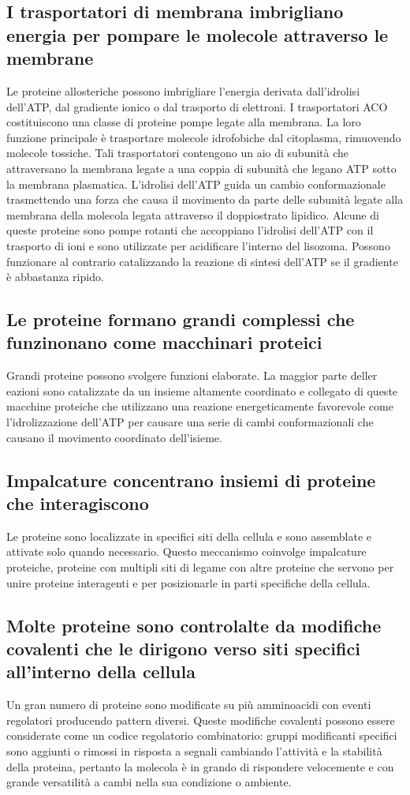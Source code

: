 \subsection{I trasportatori di membrana imbrigliano energia per pompare le molecole attraverso le membrane}
Le proteine allosteriche possono imbrigliare l'energia derivata dall'idrolisi dell'ATP, dal gradiente ionico o dal trasporto di elettroni. I trasportatori ACO costituiscono una classe
di proteine pompe legate alla membrana. La loro funzione principale \`e trasportare molecole idrofobiche dal citoplasma, rimuovendo molecole tossiche. Tali trasportatori contengono un
aio di subunit\`a che attraversano la membrana legate a una coppia di subunit\`a che legano ATP sotto la membrana plasmatica. L'idrolisi dell'ATP guida un cambio conformazionale
trasmettendo una forza che causa il movimento da parte delle subunit\`a legate alla membrana della molecola legata attraverso il doppiostrato lipidico. Alcune di queste proteine 
sono pompe rotanti che accoppiano l'idrolisi dell'ATP con il trasporto di ioni  e sono utilizzate per acidificare l'interno del lisozoma. Possono funzionare al contrario 
catalizzando la reazione di sintesi dell'ATP se il gradiente \`e abbastanza ripido. 
\subsection{Le proteine formano grandi complessi che funzinonano come macchinari proteici}
Grandi proteine possono svolgere funzioni elaborate. La maggior parte deller eazioni sono catalizzate da un insieme altamente coordinato e collegato di queste macchine proteiche che
utilizzano una reazione energeticamente favorevole come l'idrolizzazione dell'ATP per causare una serie di cambi conformazionali che causano il movimento coordinato dell'isieme. 
\subsection{Impalcature concentrano insiemi di proteine che interagiscono}
Le proteine sono localizzate in specifici siti della cellula e sono assemblate e attivate solo quando necessario. Questo meccanismo coinvolge impalcature proteiche, proteine con 
multipli siti di legame con altre proteine che servono per unire proteine interagenti e per posizionarle in parti specifiche della cellula. 
\subsection{Molte proteine sono controlalte da modifiche covalenti che le dirigono verso siti specifici all'interno della cellula}
Un gran numero di proteine sono modificate su pi\`u amminoacidi con eventi regolatori producendo pattern diversi. Queste modifiche covalenti possono essere considerate come un codice
regolatorio combinatorio: gruppi modificanti specifici sono aggiunti o rimossi in risposta a segnali cambiando l'attivit\`a e la stabilit\`a della proteina, pertanto la molecola \`e in
grando di rispondere velocemente e con grande versatilit\`a a cambi nella sua condizione o ambiente.
